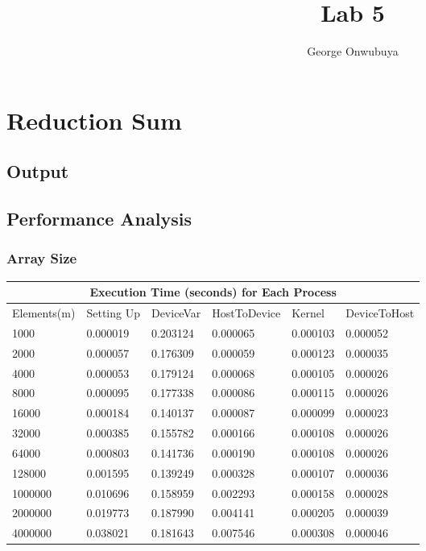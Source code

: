 \documentclass{article}
\title{Lab 5}
\author{George Onwubuya}
\begin{document}
\maketitle

\section{Reduction Sum}
\subsection{Output}

\subsection{Performance Analysis}
 \subsubsection{Array Size} 
 \setlength{\parindent}{1cm}
 \begin{tabular}{ |p{2.5cm}||p{2cm}|p{2cm}|p{2cm}|p{2cm}|p{2cm}|  }
 \hline
 \multicolumn{6}{|c|}{Execution Time (seconds) for Each Process } \\
 \hline
Elements(m) & Setting Up & DeviceVar & HostToDevice & Kernel & DeviceToHost\\
 \hline
 1000 & 0.000019 & 0.203124 & 0.000065 & 0.000103 & 0.000052\\
 \hline
 2000 & 0.000057 & 0.176309 & 0.000059 & 0.000123 & 0.000035\\
 \hline
 4000 & 0.000053 & 0.179124 & 0.000068 & 0.000105 & 0.000026\\
 \hline
 8000 & 0.000095 & 0.177338 & 0.000086 & 0.000115 & 0.000026\\
 \hline
 16000 & 0.000184 & 0.140137 & 0.000087 & 0.000099 & 0.000023\\
 \hline
 32000 & 0.000385 & 0.155782 & 0.000166 & 0.000108 & 0.000026\\
 \hline
 64000 & 0.000803 & 0.141736 & 0.000190 & 0.000108 & 0.000026\\
 \hline
 128000 & 0.001595 & 0.139249 & 0.000328 & 0.000107 & 0.000036\\
 \hline 
 1000000 & 0.010696 & 0.158959 & 0.002293 & 0.000158 & 0.000028\\
 \hline 
 2000000 & 0.019773 & 0.187990 & 0.004141 & 0.000205 & 0.000039\\
 \hline 
 4000000 & 0.038021 & 0.181643 & 0.007546 & 0.000308 & 0.000046\\
 \hline 
 \end{tabular}
 
\end{document}
